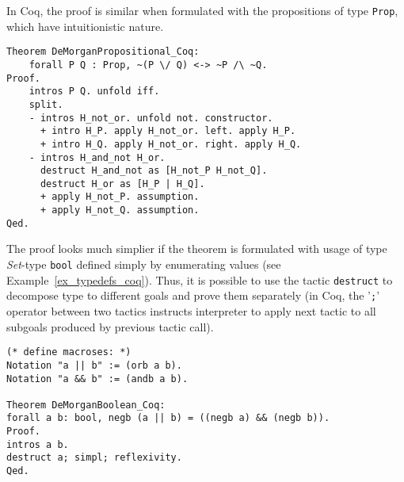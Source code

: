 \documentclass[article]{aaltoseries}
\begin{document}
In Coq, the proof is similar when formulated with the propositions of type \texttt{Prop}, which have intuitionistic nature.



    
\begin{lstlisting}[language=coq, caption={Proof of the de Morgan's law for propositions in Coq}, label={ex_morgan_propos_coq}]
Theorem DeMorganPropositional_Coq:
    forall P Q : Prop, ~(P \/ Q) <-> ~P /\ ~Q.
Proof.
    intros P Q. unfold iff.
    split.
    - intros H_not_or. unfold not. constructor.
      + intro H_P. apply H_not_or. left. apply H_P.
      + intro H_Q. apply H_not_or. right. apply H_Q.
    - intros H_and_not H_or.
      destruct H_and_not as [H_not_P H_not_Q].
      destruct H_or as [H_P | H_Q].
      + apply H_not_P. assumption.
      + apply H_not_Q. assumption.
Qed.
\end{lstlisting}



The proof looks much simplier if the theorem is formulated with usage of type \textit{Set}-type \texttt{bool} defined simply by enumerating values (see Example~\ref{ex_typedefs_coq}). Thus, it is possible to use the tactic \texttt{destruct} to decompose type to different goals and prove them separately (in Coq, the '\texttt{;}' operator between two tactics instructs interpreter to apply next tactic to all subgoals produced by previous tactic call).

\begin{lstlisting}[language=coq,caption={Proof of the de Morgan's law for booleans in Coq}, label={ex_morgan_bool_coq}]
(* define macroses: *)
Notation "a || b" := (orb a b).
Notation "a && b" := (andb a b).

Theorem DeMorganBoolean_Coq:
forall a b: bool, negb (a || b) = ((negb a) && (negb b)).
Proof.
intros a b.
destruct a; simpl; reflexivity.
Qed.
\end{lstlisting}
\end{document}
